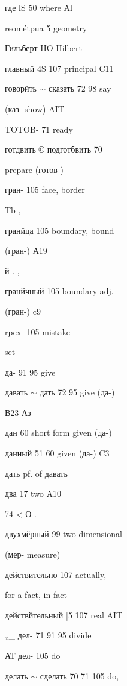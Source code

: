 \begin{minipage}[t]{0.475\textwidth}
\raggedright
\noindent где lS 50 where Al\par
\noindent reométpua 5 geometry\par
\noindent Гильберт HO Hilbert\par
\noindent главный 4S 107 principal C11\par
\noindent говорйть $\sim$ сказать 72 98 say\par
\noindent (каз- show) AIT\par
\noindent TOTOB- 71 ready\par
{} готдвить © подготбвить 70\par
\noindent prepare (готов-)\par
\noindent гран- 105 face, border\par
\noindent Tb ,\par
\noindent гранйца 105 boundary, bound\par
\noindent (гран-) А19\par
{} й . ,\par
\noindent гранйчный 105 boundary adj.\par
\noindent (гран-) c9\par
{}\par
\noindent rpex- 105 mistake\par
\noindent set\par
\noindent да- 91 95 give\par
\noindent давать $\sim$ дать 72 95 give (да-)\par
\noindent В23 Аз\par
\noindent дан 60 short form given (да-)\par
\noindent данный 51 60 given (да-) C3\par
\noindent дать pf. of давать\par
\noindent два 17 two A10\par
{} 74 < О .\par
\noindent двухмёрный 99 two-dimensional\par
\noindent (мер- measure)\par
{} действительно 107 actually,\par
\noindent for a fact, in fact\par
\noindent действйтельный |5 107 real AIT\par
\noindent „\_  дел- 71 91 95 divide\par
\noindent АТ дел- 105 do\par
\noindent делать $\sim$ сделать 70 71 105 do,\par

\end{minipage}
